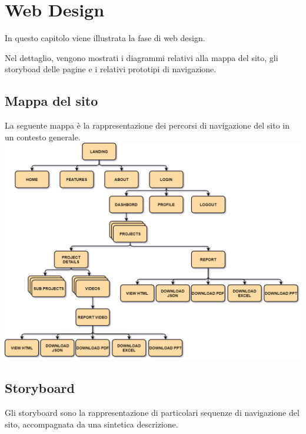 
\chapter{Web Design}\label{chap:web-design}
In questo capitolo viene illustrata la fase di web design.

Nel dettaglio, vengono mostrati i diagrammi relativi alla mappa del sito, gli 
storyboad delle pagine e i relativi prototipi di navigazione.

\section{Mappa del sito}\label{sec:mappa-sito}
La seguente mappa è la rappresentazione dei percorsi di navigazione del sito in 
un contesto generale.
\includegraphics{images/mappa-sito.png}

\section{Storyboard}\label{sec:storyboard}
Gli storyboard sono la rappresentazione di particolari sequenze di navigazione 
del sito, accompagnata da una sintetica descrizione.


